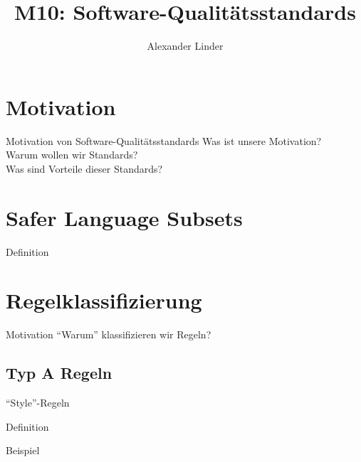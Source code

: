 \documentclass{beamer}
\title{M10: Software-Qualitätsstandards}
\author{Alexander Linder}
\date{} %
\begin{document}

    \begin{frame}
        \maketitle
    \end{frame}

    \begin{frame}
        \tableofcontents
    \end{frame}

    \section{Motivation}
    \label{sec:motivation}
    \begin{frame}{Motivation von Software-Qualitätsstandards}
        Was ist unsere Motivation?\\
        Warum wollen wir Standards?\\
        Was sind Vorteile dieser Standards?
    \end{frame}

    \section{Safer Language Subsets}
    \label{sec:safer-language-subsets}
    \begin{frame}{Definition}

    \end{frame}

    \section{Regelklassifizierung}
    \label{sec:regelklassifizierung}
    \begin{frame}{Motivation}
        \enquote{Warum} klassifizieren wir Regeln?
    \end{frame}

    \subsection{Typ A Regeln}
    \label{subsec:typ-a-regeln}
    \begin{frame}{\enquote{Style}-Regeln}
        \begin{block}{Definition}

        \end{block}
        \begin{exampleblock}{Beispiel}
            
        \end{exampleblock}
    \end{frame}
\end{document}
